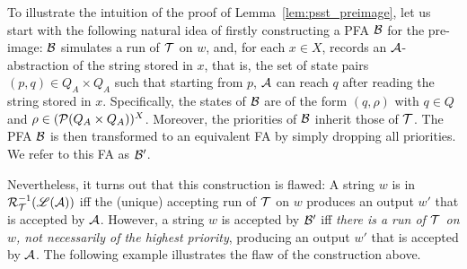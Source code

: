 To illustrate the intuition of the proof of Lemma~\ref{lem:psst_preimage}, let us start with the following natural idea of firstly constructing a PFA $\mathcal{B}$ for the pre-image: $\mathcal{B}$ simulates a run of $\mathcal{T}$ on $w$, and, for each $x \in X$, records an $\mathcal{A}$-abstraction of the string stored in $x$, that is, the set of state pairs $(p, q) \in Q_A \times Q_A$ such that starting from $p$, $\mathcal{A}$ can reach $q$ after reading the string stored in $x$. Specifically, the states of $\mathcal{B}$ are of the form $(q, \rho)$ with $q \in Q$ and $\rho \in (\mathcal{P}(Q_A \times Q_A ))^{X}$. Moreover, the priorities of $\mathcal{B}$ inherit those of $\mathcal{T}$. The PFA $\mathcal{B}$ is then transformed to an equivalent FA by simply dropping all priorities. We refer to this FA as $\mathcal{B}'$.

Nevertheless, it turns out that this construction is flawed: A string $w$ is in $\mathcal{R}^{-1}_{\mathcal{T}}(\mathscr{L}(\mathcal{A}))$ iff the (unique) accepting run of $\mathcal{T}$ on $w$ produces an output $w'$ that is accepted by $\mathcal{A}$. However, a string $w$ is accepted by $\mathcal{B}'$ iff \emph{there is a run of $\mathcal{T}$ on $w$, not necessarily of the highest priority}, producing an output $w'$ that is accepted by $\mathcal{A}$. The following example illustrates the flaw of the construction above.

